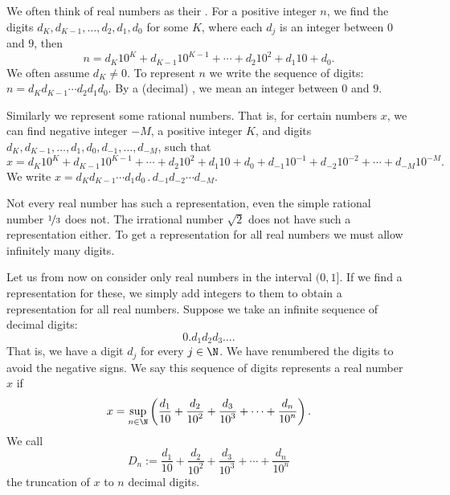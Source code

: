 \documentclass[12pt]{book}
\begin{document}

We often think of real numbers as their
\emph{}.
For
a positive integer $n$, we find the digits $d_K,d_{K-1},\ldots,d_2,d_1,d_0$ for some
$K$,
where each $d_j$ is an integer between $0$ and $9$, then
\begin{equation*}
n = d_K {10}^K + d_{K-1} {10}^{K-1} + \cdots + d_2 {10}^2 + d_1 10 + d_0 .
\end{equation*}
We often assume $d_K \not= 0$.
To represent $n$ we write the sequence of
digits: $n = d_K d_{K-1} \cdots d_2 d_1 d_0$.
By a (decimal)
\emph{}, we mean an integer
between $0$ and $9$.

Similarly we
represent some rational numbers.
That is, for certain
numbers $x$, we can find
negative integer $-M$, a positive integer $K$, and digits
$d_K,d_{K-1},\ldots,d_1,d_0,d_{-1},\ldots,d_{-M}$, such that
\begin{equation*}
x = d_K {10}^K + d_{K-1} {10}^{K-1} + \cdots + d_2 {10}^2 + d_1 10 + d_0 
+ d_{-1} {10}^{-1} + d_{-2} {10}^{-2} + \cdots + d_{-M} {10}^{-M} .
\end{equation*}
We write $x = d_K d_{K-1} \cdots d_1 d_0 \, . \, d_{-1} d_{-2} \cdots d_{-M}$.

Not every real number has such a representation, even the simple
rational number $\nicefrac{1}{3}$ does not.
The irrational number $\sqrt{2}$ 
does not have such a representation either.
To get a representation for
all real numbers we must allow infinitely many digits.

Let us from now on consider only real numbers in the interval $(0,1]$.
If
we find a representation for these, we simply add
integers to them to obtain a representation for all real numbers.
Suppose we take an infinite sequence of decimal digits:
\begin{equation*}
0.d_1d_2d_3\ldots.
\end{equation*}
That is, we have a digit $d_j$ for every $j \in \N$.
We have renumbered the digits to avoid the negative signs.
We say this
sequence of digits represents a real number $x$ if
\begin{equation*}
x =
\sup_{n \in \N} \left(
\frac{d_1}{10} + 
\frac{d_2}{{10}^2} + 
\frac{d_3}{{10}^3} + 
\cdots +
\frac{d_n}{{10}^n}
\right) .
\end{equation*}
We call
\begin{equation*}
D_n := 
\frac{d_1}{10} + 
\frac{d_2}{{10}^2} + 
\frac{d_3}{{10}^3} + 
\cdots +
\frac{d_n}{{10}^n} 
\end{equation*}
the truncation of $x$ to $n$ decimal digits.
\end{document}
